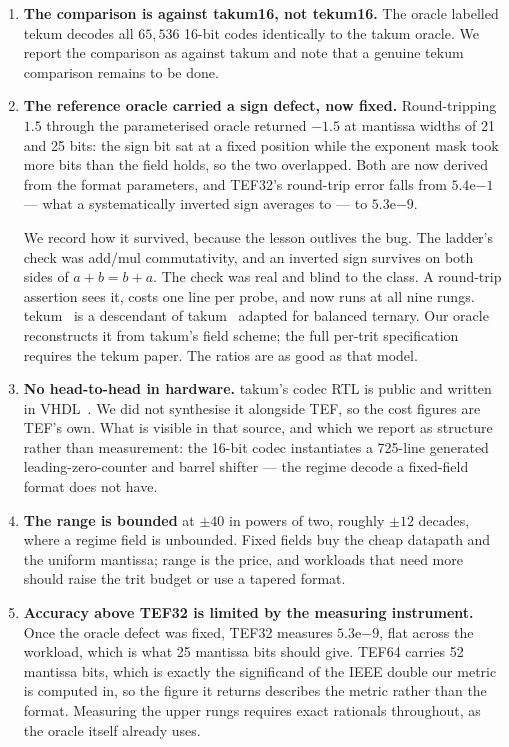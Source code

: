\documentclass[11pt]{article}
\theoremstyle{definition}
\begin{document}
\begin{enumerate}[leftmargin=*]
\item \textbf{The comparison is against takum16, not tekum16.} The oracle
labelled tekum decodes all $65{,}536$ 16-bit codes identically to the takum
oracle. We report the comparison as against takum and note that a genuine tekum
comparison remains to be done.

\item \textbf{The reference oracle carried a sign defect, now fixed.} Round-tripping
$1.5$ through the parameterised oracle returned $-1.5$ at mantissa widths of 21
and 25 bits: the sign bit sat at a fixed position while the exponent mask took
more bits than the field holds, so the two overlapped. Both are now derived from
the format parameters, and TEF32's round-trip error falls from
$5.4\mathrm{e}{-1}$ --- what a systematically inverted sign averages to --- to
$5.3\mathrm{e}{-9}$.

We record how it survived, because the lesson outlives the bug. The ladder's
check was add/mul commutativity, and an inverted sign survives on both sides of
$a+b=b+a$. The check was real and blind to the class. A round-trip assertion sees
it, costs one line per probe, and now runs at all nine rungs. tekum~\cite{tekum} is a descendant of takum~\cite{takum} adapted for balanced
ternary. Our
oracle reconstructs it from takum's field scheme; the full per-trit
specification requires the tekum paper. The ratios are as good as that model.

\item \textbf{No head-to-head in hardware.} takum's codec RTL is public and
written in VHDL~\cite{takumrtl}. We did not synthesise it alongside TEF, so the cost figures are
TEF's own. What is visible in that source, and which we report as structure
rather than measurement: the 16-bit codec instantiates a 725-line generated
leading-zero-counter and barrel shifter --- the regime decode a fixed-field
format does not have.

\item \textbf{The range is bounded} at $\pm40$ in powers of two, roughly $\pm12$
decades, where a regime field is unbounded. Fixed fields buy the cheap datapath
and the uniform mantissa; range is the price, and workloads that need more should
raise the trit budget or use a tapered format.

\item \textbf{Accuracy above TEF32 is limited by the measuring instrument.}
Once the oracle defect was fixed, TEF32 measures $5.3\mathrm{e}{-9}$, flat
across the workload, which is what 25 mantissa bits should give. TEF64 carries
52 mantissa bits, which is exactly the significand of the IEEE double our metric
is computed in, so the figure it returns describes the metric rather than the
format. Measuring the upper rungs requires exact rationals throughout, as the
oracle itself already uses.


\end{enumerate}
\end{document}

